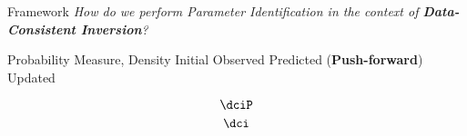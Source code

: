 \begin{block}{Framework}
\centering
\large
    \emph{How do we perform Parameter Identification in the context of \textbf{Data-Consistent Inversion}?}
    \begin{itemize}
        \itembox{$ \PP, \; \pi $} Probability Measure, Density
        \itembox{$ \initialP, \; \initial $} Initial
        \itembox{$ \observedP, \; \observed $} Observed
        \itembox{$ \predictedP, \; \predicted $} Predicted (\textbf{Push-forward})
        \itembox{$ \updatedP, \; \updated $} Updated
    \end{itemize}

\Large
    \begin{equation*}
            \dciP 
    \end{equation*}
    \begin{equation*}
            \dci
    \end{equation*}
\end{block}
